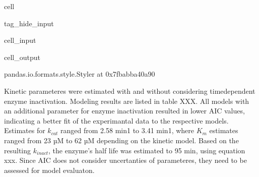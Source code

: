 \documentclass[letterpaper,10pt,english]{jupyterBook}
\begin{document}
\begin{sphinxuseclass}{cell}
\begin{sphinxuseclass}{tag_hide_input}
\begin{sphinxVerbatimInput}
\begin{sphinxuseclass}{cell_input}
\begin{sphinxVerbatim}[commandchars=\\\{\}]
  
\end{sphinxVerbatim}

\end{sphinxuseclass}\end{sphinxVerbatimInput}
\begin{sphinxVerbatimOutput}

\begin{sphinxuseclass}{cell_output}
\begin{sphinxVerbatim}[commandchars=\\\{\}]
\PYGZlt{}pandas.io.formats.style.Styler at 0x7fbabba40a90\PYGZgt{}
\end{sphinxVerbatim}

\end{sphinxuseclass}\end{sphinxVerbatimOutput}

\end{sphinxuseclass}
\end{sphinxuseclass}
\sphinxAtStartPar
Kinetic parameteres were estimated with and without considering time\sphinxhyphen{}dependent enzyme inactivation.
Modeling results are listed in table XXX. All models with an additional parameter for enzyme inactivation resulted in lower AIC values, indicating a better fit of the experimantal data to the respective models.
Estimates for \(k_{cat}\) ranged from 2.58 min\sphinxhyphen{}1 to 3.41 min\sphinxhyphen{}1, where \(K_{m}\) estimates ranged from 23 µM to 62 µM depending on the kinetic model.
Based on the resulting \(k_{inact}\), the enzyme’s half life was estimated to 95 min, using equation xxx.
Since AIC does not consider uncertanties of parameteres, they need to be assessed for model evaluaton.
\end{document}
